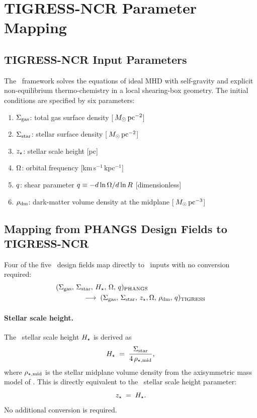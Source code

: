 \section{TIGRESS-NCR Parameter Mapping}
\label{sec:tigress_mapping}

\subsection{TIGRESS-NCR Input Parameters}

The \TIGRESS\ framework \citep{2024ApJ...972...67K} solves the equations of
ideal MHD with self-gravity and explicit non-equilibrium thermo-chemistry in a
local shearing-box geometry. The initial conditions are specified by six
parameters:
\begin{enumerate}
  \item $\Sigma_{\rm gas}$: total gas surface density [$\, M_{\odot}\,{\rm pc^{-2}}$]
  \item $\Sigma_{\rm star}$: stellar surface density [$\, M_{\odot}\,{\rm pc^{-2}}$]
  \item $z_\star$: stellar scale height [pc]
  \item $\Omega$: orbital frequency [km\,s$^{-1}$\,kpc$^{-1}$]
  \item $q$: shear parameter $q \equiv -d\ln\Omega/d\ln R$ [dimensionless]
  \item $\rho_{\rm dm}$: dark-matter volume density at the midplane [$\, M_{\odot}\,{\rm pc^{-3}}$]
\end{enumerate}

\subsection{Mapping from PHANGS Design Fields to TIGRESS-NCR}

Four of the five \PHANGS\ design fields map directly to \TIGRESS\ inputs with
no conversion required:
\begin{align}
(\Sigma_{\rm gas},\, \Sigma_{\rm star},\, H_\star,\, \Omega,\, q)_{\rm PHANGS}
&\nonumber\\
\longrightarrow\;
(\Sigma_{\rm gas},\, \Sigma_{\rm star},\, z_\star,&\, \Omega,\, \rho_{\rm dm},\, q)_{\rm TIGRESS}
\end{align}

\paragraph{Stellar scale height.}
The \PHANGS\ stellar scale height $H_\star$ is derived as
\begin{equation}
  H_\star \;=\; \frac{\Sigma_{\rm star}}{4\,\rho_{\star,\rm mid}},
  \label{eq:hstar}
\end{equation}
where $\rho_{\star,\rm mid}$ is the stellar midplane volume density from the
axisymmetric mass model of \citet{2025ApJ...989...66V}. This is directly
equivalent to the \TIGRESS\ stellar scale height parameter:
\begin{equation}
  z_\star \;=\; H_\star.
\end{equation}
No additional conversion is required.

